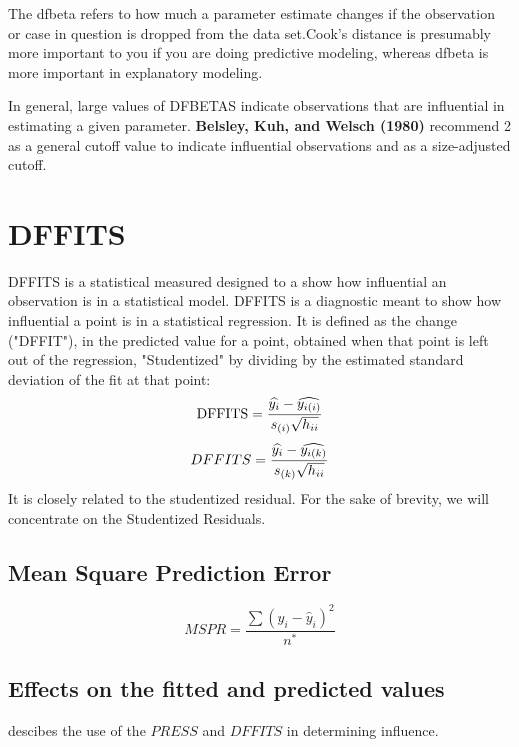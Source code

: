 \documentclass[12pt, a4paper]{report}
\theoremstyle{plain}
\theoremstyle{definition}
\theoremstyle{remark}
\begin{document}
 The dfbeta refers to how much a parameter estimate changes if the observation or case in question is dropped from the data set.Cook's distance is presumably more important to you if you are doing predictive modeling, whereas dfbeta is more important in explanatory modeling.
 
In general, large values of DFBETAS indicate observations that are influential in estimating a given parameter. \textbf{Belsley, Kuh, and Welsch (1980)} recommend 2 as a general cutoff value to indicate influential observations and  as a size-adjusted cutoff.




\section{DFFITS} %
DFFITS is a statistical measured designed to a show how influential an observation is in a statistical model. DFFITS is a diagnostic meant to show how influential a point is in a statistical regression. It is defined as the change ("DFFIT"), in the predicted value for a point, obtained when that point is left out of the regression, "Studentized" by dividing by the estimated standard deviation of the fit at that point:
\[ \mbox{DFFITS} = {\widehat{y_i} - \widehat{y_{i(i)}} \over s_{(i)} \sqrt{h_{ii}}}\]
\begin{displaymath} DFFITS = {\widehat{y_i} -
	\widehat{y_{i(k)}} \over s_{(k)} \sqrt{h_{ii}}} \end{displaymath}
It is closely related to the studentized residual. For the sake of brevity, we will concentrate on the Studentized Residuals.

\subsection{Mean Square Prediction Error}
\begin{equation}
MSPR = \frac{\sum (y_{i}-\hat{y}_{i})^2}{n^*}
\end{equation}

\subsection{Effects on the fitted and predicted values}
\citet{schabenberger} descibes the use of the $PRESS$ and $DFFITS$ in determining influence.
\end{document}
